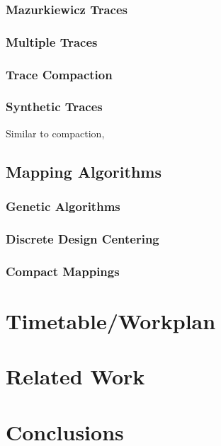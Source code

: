 \documentclass{article}
\begin{document}
\subsubsection{Mazurkiewicz Traces}

\subsubsection{Multiple Traces}

\subsubsection{Trace Compaction}

\subsubsection{Synthetic Traces}
Similar to compaction, 

\subsection{Mapping Algorithms}

\subsubsection{Genetic Algorithms}

\subsubsection{Discrete Design Centering} 

\subsubsection{Compact Mappings}

\section{Timetable/Workplan}

\section{Related Work}
\section{Conclusions} 
%

 
\end{document}

